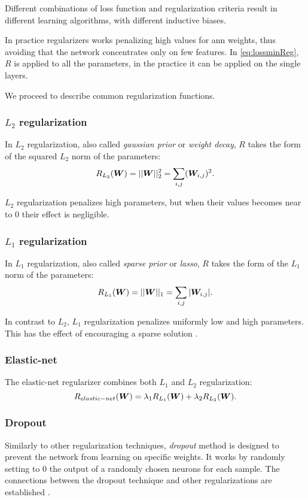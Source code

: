 Different combinations of loss function and regularization criteria
result in different learning algorithms, with different inductive
biases.

In practice regularizers works penalizing high values for \ac{ann}
weights, thus avoiding that the network concentrates only on few
features. In \eqref{eq:lossminReg}, $R$ is applied to all the
parameters, in the practice it can be applied on the single layers.

We proceed to describe common regularization functions.

\subsubsection{$L_2$ regularization}
In $L_2$ regularization, also called \emph{gaussian prior} or
\emph{weight decay}, $R$ takes the form of the squared $L_2$ norm
of the parameters:
\begin{equation*}
  R_{L_2}(\bm{W})=||\bm{W}||_2^2=\sum_{i,j}(\bm{W}_{i,j})^2.
\end{equation*}

$L_2$ regularization penalizes high parameters, but when their values
becomes near to $0$ their effect is negligible.

\subsubsection{$L_1$ regularization}
In $L_1$ regularization, also called \emph{sparse prior} or
\emph{lasso}, $R$ takes the form of the $L_1$ norm of the parameters:
\begin{equation*}
  R_{L_1}(\bm{W})=||\bm{W}||_1=\sum_{i,j}|\bm{W}_{i,j}|.
\end{equation*}

In contrast to $L_2$, $L_1$ regularization penalizes uniformly low and
high parameters. This has the effect of encouraging a sparse solution
\cite{tibshirani1996regression}.

\subsubsection{Elastic-net}
The elastic-net regularizer \cite{zou2005regularization} combines both
$L_1$ and $L_2$ regularization:
\begin{equation*}
  R_{elastic-net}(\bm{W})=\lambda_1R_{L_1}(\bm{W})+\lambda_2R_{L_2}(\bm{W}).
\end{equation*}

\subsubsection{Dropout}
Similarly to other regularization techniques, \emph{dropout} method
\cite{hinton2012improving} is designed to prevent the network from
learning on specific weights. It works by randomly setting to $0$ the
output of a randomly chosen neurons for each sample. The connections
between the dropout technique and other regularizations are
established \cite{wager2013dropout}.
